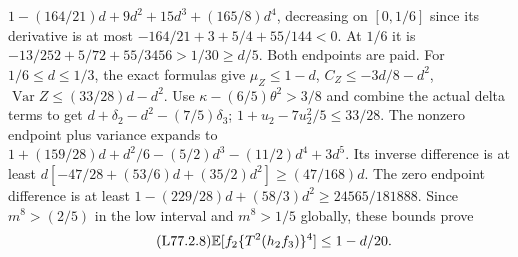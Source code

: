 $1-(164/21)d+9d^2+15d^3+(165/8)d^4$,
decreasing on $[0,1/6]$ since its derivative is at most
$-164/21+3+5/4+55/144<0$.
At $1/6$ it is $-13/252+5/72+55/3456>1/30\ge d/5$.
Both endpoints are paid.
For $1/6\le d\le1/3$, the exact formulas give
$\mu_Z\le1-d$, $C_Z\le-3d/8-d^2$,
$\operatorname{Var}Z\le(33/28)d-d^2$.
Use $\kappa-(6/5)\theta^2>3/8$ and combine the actual delta terms
to get $d+\delta_2-d^2-(7/5)\delta_3$;
$1+u_2-7u_2^2/5\le33/28$.
The nonzero endpoint plus variance expands to
$1+(159/28)d+d^2/6-(5/2)d^3-(11/2)d^4+3d^5$.
Its inverse difference is at least
$d[-47/28+(53/6)d+(35/2)d^2]\ge(47/168)d$.
The zero endpoint difference is at least
$1-(229/28)d+(58/3)d^2\ge24565/181888$.
Since $m^8>(2/5)$ in the low interval and $m^8>1/5$ globally,
these bounds prove
\begin{equation}\tag{L77.2.8}\label{eq:L77:23result}
\mathbb E[f_2\{T^2(h_2f_3)\}^4]\le1-d/20.
\end{equation}

